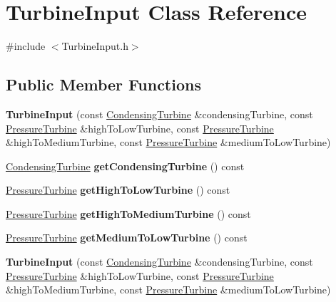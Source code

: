 \hypertarget{class_turbine_input}{}\section{Turbine\+Input Class Reference}
\label{class_turbine_input}


{\ttfamily \#include $<$Turbine\+Input.\+h$>$}

\subsection*{Public Member Functions}
\begin{DoxyCompactItemize}
\item 
\mbox{\label{class_turbine_input_a0d7992d1f976498938f5db9db4aedda0}} 
{\bfseries Turbine\+Input} (const \hyperlink{class_condensing_turbine}{Condensing\+Turbine} \&condensing\+Turbine, const \hyperlink{class_pressure_turbine}{Pressure\+Turbine} \&high\+To\+Low\+Turbine, const \hyperlink{class_pressure_turbine}{Pressure\+Turbine} \&high\+To\+Medium\+Turbine, const \hyperlink{class_pressure_turbine}{Pressure\+Turbine} \&medium\+To\+Low\+Turbine)
\item 
\mbox{\label{class_turbine_input_a27fb20f2b3924fd8da72e975641973fe}} 
\hyperlink{class_condensing_turbine}{Condensing\+Turbine} {\bfseries get\+Condensing\+Turbine} () const
\item 
\mbox{\label{class_turbine_input_a0292abe52145b140ab3de9fc24f59df8}} 
\hyperlink{class_pressure_turbine}{Pressure\+Turbine} {\bfseries get\+High\+To\+Low\+Turbine} () const
\item 
\mbox{\label{class_turbine_input_ae3e5edc47142a9567e14632fb56f578c}} 
\hyperlink{class_pressure_turbine}{Pressure\+Turbine} {\bfseries get\+High\+To\+Medium\+Turbine} () const
\item 
\mbox{\label{class_turbine_input_ab7ead42f7d2d296868ccf43d1beff56b}} 
\hyperlink{class_pressure_turbine}{Pressure\+Turbine} {\bfseries get\+Medium\+To\+Low\+Turbine} () const
\item 
\mbox{\label{class_turbine_input_a0d7992d1f976498938f5db9db4aedda0}} 
{\bfseries Turbine\+Input} (const \hyperlink{class_condensing_turbine}{Condensing\+Turbine} \&condensing\+Turbine, const \hyperlink{class_pressure_turbine}{Pressure\+Turbine} \&high\+To\+Low\+Turbine, const \hyperlink{class_pressure_turbine}{Pressure\+Turbine} \&high\+To\+Medium\+Turbine, const \hyperlink{class_pressure_turbine}{Pressure\+Turbine} \&medium\+To\+Low\+Turbine)

\end{DoxyCompactItemize}
